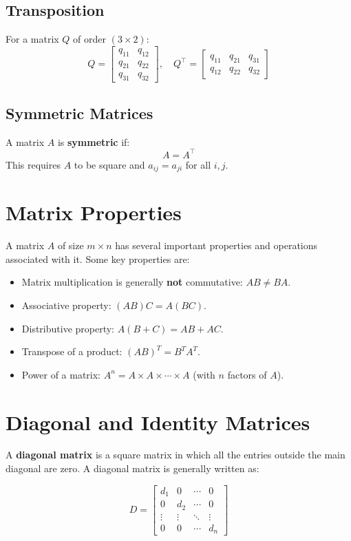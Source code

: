 \documentclass{article}
\begin{document}
\subsection{Transposition}
For a matrix $Q$ of order $(3 \times 2)$:
\[
Q = \begin{bmatrix}
    q_{11} & q_{12} \\
    q_{21} & q_{22} \\
    q_{31} & q_{32}
\end{bmatrix}, \quad
Q^\top = \begin{bmatrix}
    q_{11} & q_{21} & q_{31} \\
    q_{12} & q_{22} & q_{32}
\end{bmatrix}
\]

\subsection{Symmetric Matrices}
A matrix $A$ is \textbf{symmetric} if:
\[
A = A^\top
\]
This requires $A$ to be square and $a_{ij} = a_{ji}$ for all $i,j$.

\section{Matrix Properties}
A matrix \( A \) of size \( m \times n \) has several important properties and operations associated with it. Some key properties are:

\begin{itemize}
    \item Matrix multiplication is generally \textbf{not} commutative: \( AB \neq BA \).
    \item Associative property: \( (AB)C = A(BC) \).
    \item Distributive property: \( A(B+C) = AB + AC \).
    \item Transpose of a product: \( (AB)^{T} = B^{T}A^{T} \).
    \item Power of a matrix: \( A^n = A \times A \times \cdots \times A \) (with \( n \) factors of \( A \)).
\end{itemize}

\section{Diagonal and Identity Matrices}
A \textbf{diagonal matrix} is a square matrix in which all the entries outside the main diagonal are zero. A diagonal matrix is generally written as:

\[
D = \begin{bmatrix}
d_1 & 0 & \cdots & 0 \\
0 & d_2 & \cdots & 0 \\
\vdots & \vdots & \ddots & \vdots \\
0 & 0 & \cdots & d_n
\end{bmatrix}
\]
\end{document}
